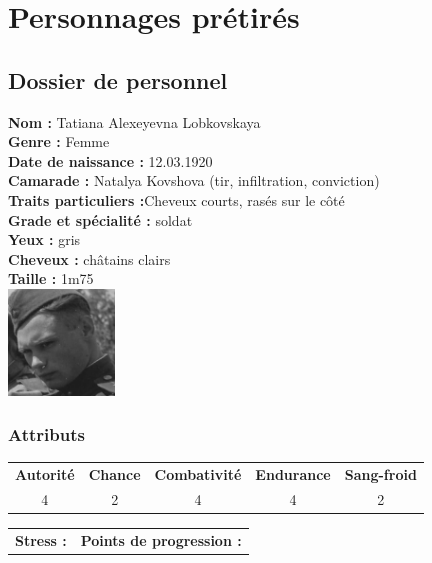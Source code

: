 \documentclass{report}
\begin{document}
\chapter{Personnages prétirés}
\newpage
\ttfamily
\begin{center}
\section*{Dossier de personnel}
\begin{multicols}{3}
\textbf{Nom :} Tatiana Alexeyevna Lobkovskaya\\
\textbf{Genre :} Femme\\
\textbf{Date de naissance :} 12.03.1920\\
\textbf{Camarade :} Natalya Kovshova (tir, infiltration, conviction)\\
\textbf{Traits particuliers :}Cheveux courts, rasés sur le côté\\
\columnbreak
\textbf{Grade et spécialité :} soldat\\
\textbf{Yeux :} gris\\
\textbf{Cheveux :} châtains clairs\\
\textbf{Taille :} 1m75\\
\columnbreak
\includegraphics[height=80pt]{tatiana.jpg}
\end{multicols}
\end{center}
\noindent\makebox[\linewidth]{\rule{\textwidth}{0.4pt}}
\subsection*{Attributs}
\begin{center}
    \begin{tabular}{c|c|c|c|c}
        \textbf{Autorité} & \textbf{Chance} & \textbf{Combativité} & \textbf{Endurance} & \textbf{Sang-froid} \\
        4 & 2 & 4 & 4 & 2\\

    \end{tabular}
\end{center}
\begin{tabular}{m{} m{}}
     \textbf{Stress :} & \textbf{Points de progression :}
\end{tabular}\\
\noindent\makebox[\linewidth]{\rule{\textwidth}{0.4pt}}
\end{document}
